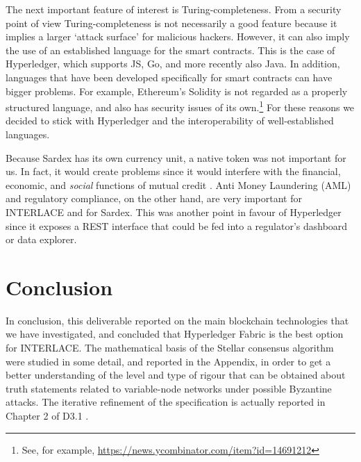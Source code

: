 The next important feature of interest is Turing-completeness. From a security point of view Turing-completeness is not necessarily a good feature because it implies a larger `attack surface' for malicious hackers. However, it can also imply the use of an established language for the smart contracts. This is the case of Hyperledger, which supports JS, Go, and more recently also Java. In addition, languages that have been developed specifically for smart contracts can have bigger problems. For example, Ethereum's Solidity is not regarded as a properly structured language, and also has security issues of its own.\footnote{See, for example, \url{https://news.ycombinator.com/item?id=14691212}} For these reasons we decided to stick with Hyperledger and the interoperability of well-established languages.

Because Sardex has its own currency unit, a native token was not important for us. In fact, it would create problems since it would interfere with the financial, economic, and \emph{social} functions of mutual credit \cite{SartoriDini2016}. Anti Money Laundering (AML) and regulatory compliance, on the other hand, are very important for INTERLACE and for Sardex. This was another point in favour of Hyperledger since it exposes a REST interface that could be fed into a regulator's dashboard or data explorer.

\chapter{Conclusion}
In conclusion, this deliverable reported on the main blockchain technologies that we have investigated, and concluded that Hyperledger Fabric is the best option for INTERLACE. The mathematical basis of the Stellar consensus algorithm were studied in some detail, and reported in the Appendix, in order to get a better understanding of the level and type of rigour that can be obtained about truth statements related to variable-node networks under possible Byzantine attacks. The iterative refinement of the specification is actually reported in Chapter 2 of D3.1 \cite{INTERLACE_D31}.






